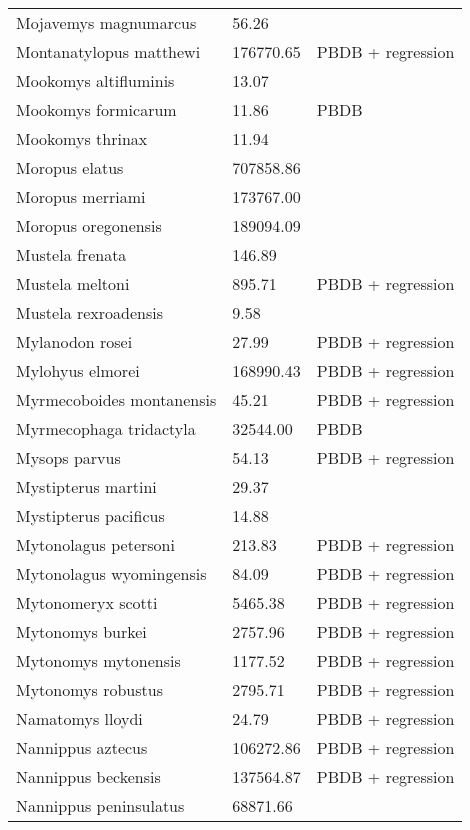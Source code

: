 \documentclass{article}
\begin{document}
\begin{center}
\begin{longtable}{p{} p{} p{} }
  Mojavemys magnumarcus & 56.26 & \cite{Tomiya2013} \\ 
  Montanatylopus matthewi & 176770.65 & PBDB + regression \\ 
  Mookomys altifluminis & 13.07 & \cite{Tomiya2013} \\ 
  Mookomys formicarum & 11.86 & PBDB \\ 
  Mookomys thrinax & 11.94 & \cite{Tomiya2013} \\ 
  Moropus elatus & 707858.86 & \cite{Tomiya2013} \\ 
  Moropus merriami & 173767.00 & \cite{McKenna2011} \\ 
  Moropus oregonensis & 189094.09 & \cite{Tomiya2013} \\ 
  Mustela frenata & 146.89 & \cite{Smith2004} \\ 
  Mustela meltoni & 895.71 & PBDB + regression \\ 
  Mustela rexroadensis & 9.58 & \cite{Tomiya2013} \\ 
  Mylanodon rosei & 27.99 & PBDB + regression \\ 
  Mylohyus elmorei & 168990.43 & PBDB + regression \\ 
  Myrmecoboides montanensis & 45.21 & PBDB + regression \\ 
  Myrmecophaga tridactyla & 32544.00 & PBDB \\ 
  Mysops parvus & 54.13 & PBDB + regression \\ 
  Mystipterus martini & 29.37 & \cite{Tomiya2013} \\ 
  Mystipterus pacificus & 14.88 & \cite{Tomiya2013} \\ 
  Mytonolagus petersoni & 213.83 & PBDB + regression \\ 
  Mytonolagus wyomingensis & 84.09 & PBDB + regression \\ 
  Mytonomeryx scotti & 5465.38 & PBDB + regression \\ 
  Mytonomys burkei & 2757.96 & PBDB + regression \\ 
  Mytonomys mytonensis & 1177.52 & PBDB + regression \\ 
  Mytonomys robustus & 2795.71 & PBDB + regression \\ 
  Namatomys lloydi & 24.79 & PBDB + regression \\ 
  Nannippus aztecus & 106272.86 & PBDB + regression \\ 
  Nannippus beckensis & 137564.87 & PBDB + regression \\ 
  Nannippus peninsulatus & 68871.66 & \cite{Tomiya2013} \\ 

\end{longtable}
\end{center}
\end{document}
